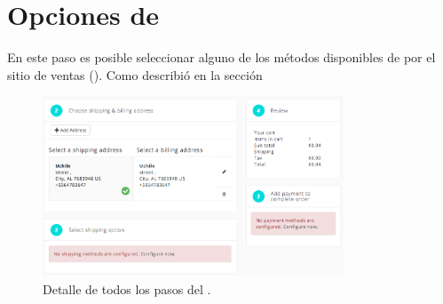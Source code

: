 \section{Opciones de \ShippingCOM}\label{chapter:solucionimplementada:section:shipping_options}

	En este paso es posible seleccionar alguno de los métodos disponibles de \ShippingCOM por el sitio de ventas (). Como describió en la sección 

	\begin{figure}[!h]
		\centering
		\includegraphics[width=0.8\textwidth]{figuras/shipping/steps.png}
		\caption{Detalle de todos los pasos del \workflowCPT \shippingEF.}
		\label{figure:shipping:checkout:select_option}
	\end{figure}